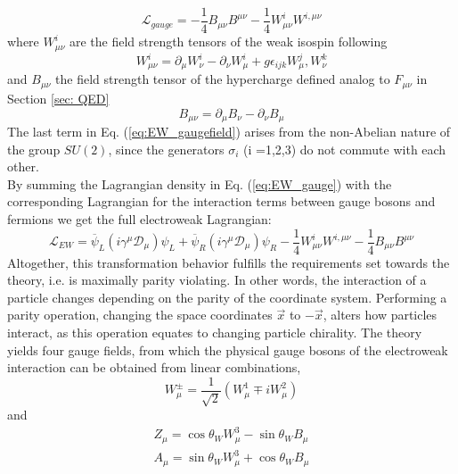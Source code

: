 \begin{equation} \label{eq:EW_gauge}
    \mathscr{L}_{gauge} = -\frac{1}{4}B_{\mu\nu}B^{\mu\nu} - \frac{1}{4}W_{\mu\nu}^iW^{i,\mu\nu}
\end{equation}
where  $W^i_{\mu\nu}$ are the field strength tensors of the weak isospin following
\begin{equation}\label{eq:EW_gaugefield}
    W_{\mu\nu}^i = \partial_{\mu}W_\nu^i - \partial_\nu W_\mu^i + g\epsilon_{ijk} W^j_\mu, W^k_\nu
\end{equation}
and $B_{\mu\nu}$ the field strength tensor of the hypercharge defined analog to $F_{\mu\nu}$ in Section \ref{sec: QED}
\begin{equation}
    B_{\mu\nu} = \partial_\mu B_\nu - \partial_\nu B_\mu    
\end{equation}
The last term in Eq. (\ref{eq:EW_gaugefield}) arises from the non-Abelian nature of the group $SU(2)$, since the generators $\sigma_i$ (i =1,2,3) do not commute with each other.\\
\indent By summing the Lagrangian density in Eq. (\ref{eq:EW_gauge}) with the corresponding Lagrangian for the interaction terms between gauge bosons and fermions we get the full electroweak Lagrangian:
\begin{equation} \label{eq:EW}
    \mathscr{L}_{EW} = \overline{\psi}_L (i\gamma^\mu\mathscr{D}_\mu)\psi_L + \overline{\psi}_R (i\gamma^\mu\mathscr{D}_\mu)\psi_R - \frac{1}{4}W_{\mu\nu}^iW^{i,\mu\nu}-\frac{1}{4}B_{\mu\nu}B^{\mu\nu}
\end{equation}
Altogether, this transformation behavior fulfills the requirements set towards the theory, i.e. is maximally parity violating. In other words, the interaction of a particle changes depending on the parity of the coordinate system. Performing a parity operation, changing the space coordinates $\vec{x}$ to $-\vec{x}$, alters how particles interact, as this operation equates to changing particle chirality. The theory yields four gauge fields, from which the physical gauge bosons of the electroweak interaction can be obtained from linear combinations,
\begin{equation}\label{eq:Charged_boson}
    W^\pm_\mu = \frac{1}{\sqrt{2}}(W_\mu^1 \mp iW_\mu^2)
\end{equation}
and
\begin{gather} \label{eq:Neutral_boson}
    Z_\mu = \cos{\theta_W}W_\mu^3 - \sin{\theta_W}B_\mu \\ \label{eq:Neutral_boson2}
    A_\mu = \sin{\theta_W} W_\mu^3 + \cos{\theta_W} B_\mu
\end{gather}
